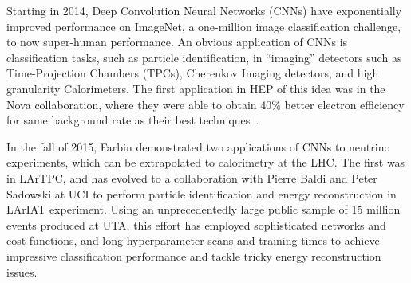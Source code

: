 

Starting in 2014, Deep Convolution Neural Networks (CNNs) have
exponentially improved performance on ImageNet, a one-million image
classification challenge\cite{}, to now super-human
performance\cite{}.  An obvious application of CNNs is classification
tasks, such as particle identification, in ``imaging'' detectors such
as Time-Projection Chambers (TPCs), Cherenkov Imaging detectors, and
high granularity Calorimeters. The first application in HEP of this
idea was in the Nova collaboration, where they were able to obtain
40\% better electron efficiency for same background rate as their best
techniques~\cite{}.


In the fall of 2015, Farbin demonstrated two applications of CNNs to
neutrino experiments, which can be extrapolated to calorimetry at the
LHC. The first was in LArTPC, and has evolved to a collaboration with
Pierre Baldi and Peter Sadowski at UCI to perform particle
identification and energy reconstruction in LArIAT experiment.  Using
an unprecedentedly large public sample of 15 million events produced
at UTA, this effort has employed sophisticated networks and cost
functions, and long hyperparameter scans and training times to achieve
impressive classification performance and tackle tricky energy
reconstruction issues. 

